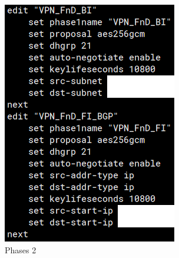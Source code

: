 \documentclass[french, a4paper]{beamer}
\begin{document}
\begin{frame}
\begin{minipage}{0.4\textwidth}
\begin{figure}[h!]
            \includegraphics[width = \linewidth]{img/fgt-auxr/ipsec-phase2.png}
            \caption{Phases 2}%
            \label{fig:fgt-auxr/ipsec-phase2}
        \end{figure}
    \end{minipage}
\end{frame}
\end{document}

